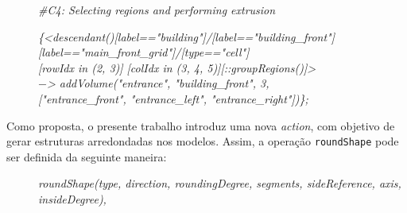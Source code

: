 \vspace{0.3cm}

\begin{description}
    \item[] \qquad \textit{\#C4: Selecting regions and performing extrusion}
    \item[] \qquad \textit{\{<descendant()[label=="building"]/[label=="building\_front"]} \\
    \textit{[label=="main\_front\_grid"]/[type=="cell"]} \\
    \textit{[rowIdx in (2, 3)] [colIdx in (3, 4, 5)][::groupRegions()]>} \\
    \textit{$-$> addVolume("entrance", "building\_front", 3,} \\
    \textit{["entrance\_front", "entrance\_left", "entrance\_right"])\};}
\end{description}

\vspace{0.3cm}

\begin{figure}[h!]
	\centering
	\captionsetup{width=15cm}
	{}	
\end{figure}

Como proposta, o presente trabalho introduz uma nova \textit{action}, com objetivo de gerar estruturas arredondadas nos modelos. Assim, a operação \texttt{roundShape} pode ser definida da seguinte maneira:

\vspace{0.3cm}

\begin{description}
    \item[] \; \textit{roundShape(type, direction, roundingDegree, segments, sideReference, axis, insideDegree),}
\end{description}

\vspace{0.3cm}

